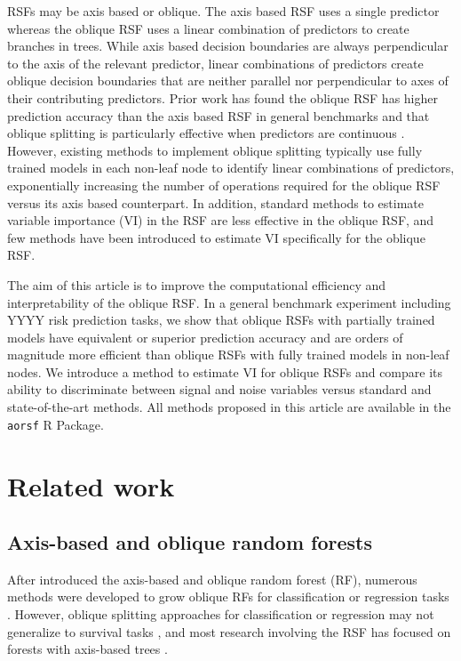\documentclass[twoside,11pt]{article}\usepackage[]{graphicx}\usepackage[]{xcolor}
\newcommand{\eg}{for example}
\begin{document}
RSFs may be axis based or oblique. The axis based RSF uses a single predictor whereas the oblique RSF uses a linear combination of predictors to create branches in trees. While axis based decision boundaries are always perpendicular to the axis of the relevant predictor, linear combinations of predictors create oblique decision boundaries that are neither parallel nor perpendicular to axes of their contributing predictors. Prior work has found the oblique RSF has higher prediction accuracy than the axis based RSF in general benchmarks \citep{jaeger2019oblique} and that oblique splitting is particularly effective when predictors are continuous \citep{menze2011oblique}. However, existing methods to implement oblique splitting typically use fully trained models in each non-leaf node to identify linear combinations of predictors, exponentially increasing the number of operations required for the oblique RSF versus its axis based counterpart. In addition, standard methods to estimate variable importance (VI) in the RSF are less effective in the oblique RSF, and few methods have been introduced to estimate VI specifically for the oblique RSF.

The aim of this article is to improve the computational efficiency and interpretability of the oblique RSF. In a general benchmark experiment including YYYY risk prediction tasks, we show that oblique RSFs with partially trained models have equivalent or superior prediction accuracy and are orders of magnitude more efficient than oblique RSFs with fully trained models in non-leaf nodes. We introduce a method to estimate VI for oblique RSFs and compare its ability to discriminate between signal and noise variables versus standard and state-of-the-art methods. All methods proposed in this article are available in the \texttt{aorsf} R Package.

\section{Related work}

\subsection{Axis-based and oblique random forests}

After \citet{breiman2001random} introduced the axis-based and oblique random forest (RF), numerous methods were developed to grow oblique RFs for classification or regression tasks \citep{menze2011oblique, zhang2014oblique, rainforth2015canonical, zhu2015reinforcement, poona2016investigating, qiu2017oblique, tomita2020sparse, katuwal2020heterogeneous}. However, oblique splitting approaches for classification or regression may not generalize to survival tasks \citep[\eg, see][Section~4.5.1]{zhu2013tree}, and most research involving the RSF has focused on forests with axis-based trees \citep{wang2017selective}.
\end{document}
